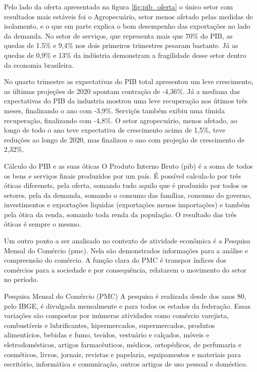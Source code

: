 \par Pelo lado da oferta apresentado na figura \ref{fig:pib_oferta} o único setor com resultados mais estáveis foi o Agropecuário, setor menos afetado pelas medidas de isolamento, e o que em parte explica o bom desempenho das exportações no lado da demanda. No setor de serviços, que representa mais que 70\% do PIB, as quedas de 1.5\% e 9,4\% nos dois primeiros trimestres pesaram bastante. Já as quedas de 0,9\% e 13\% da indústria demonstram a fragilidade desse setor dentro da economia brasileira.
\par No quarto trimestre as expectativas do PIB total apresentou um leve crescimento, as últimas projeções de 2020 apontam contração de -4,36\%. Já a mediana das expectativas do PIB da industria mostrou uma leve recuperação nos útimos três meses, finalizando o ano com -3,9\%. Serviçõs também exibiu uma tímida recuperação, finalizando com -4,8\%. O setor agropecuário, menos afetado, ao longo de todo o ano teve expectativa de crescimento acima de 1,5\%, teve reduções ao longo de 2020, mas finalizou o ano com projeção de crescimento de 2,32\%.

\begin{smbox}[label={labelbox},nameref={Cálculo do PIB e as suas óticas}]{Cálculo do PIB e as suas óticas}
	O Produto Interno Bruto (\acrshort{pib}) é a soma de todos os bens e serviços finais produzidos por um país. É possível calcula-lo por três óticas diferenets, pela oferta, somando tudo aquilo que é produzido por todos os setores, pela da demanda, somando o consumo das famílias, consumo do governo, investimentos e exportações liquidas (exportações menos importações) e também pela ótica da renda, somando toda renda da população. O resultado das três óticas é sempre o mesmo.
\end{smbox}


\par Um outro ponto a ser analisado no contexto de atividade econômica é a Pesquisa Mensal do Comércio (\acrshort{pmc}). Nela são demonstrados informações para a análise e compreensão do comércio. A função clara do PMC é transpor índices dos comércios para a sociedade e por consequência, relatarem o movimento do setor no período.

 \begin{smbox}[label={labelbox},nameref={Pesquisa Mensal do Comércio(PMC)}]{Pesquisa Mensal do Comércio (PMC)}
	A pesquisa é realizada desde dos anos 80, pelo IBGE, é divulgada mensalmente e para todos os estados da federação. Essas variações são compostas por inúmeras atividades como comércio varejista, combustíveis e lubrificantes, hipermercados, supermercados, produtos alimentícios, bebidas e fumo, tecidos, vestuário e calçados, móveis e eletrodomésticos, artigos farmacêuticos, médicos, ortopédicos, de perfumaria e cosméticos, livros, jornais, revistas e papelaria, equipamentos e materiais para escritório, informática e comunicação, outros artigos de uso pessoal e doméstico.
 \end{smbox}

